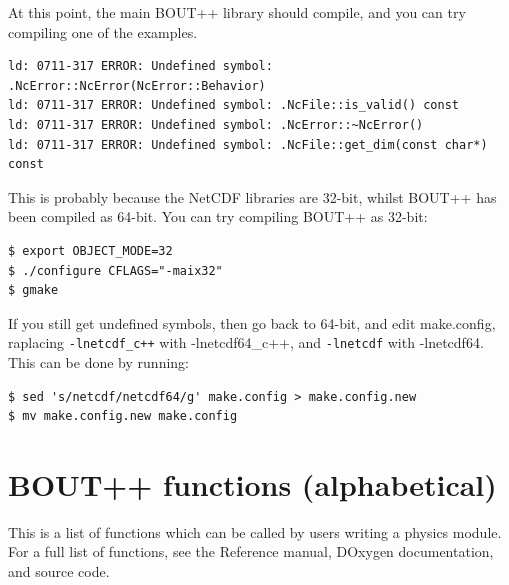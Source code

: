 \documentclass[12pt]{article}
\newcommand{\code}[1]{\texttt{#1}}
\begin{document}
At this point, the main BOUT++ library should compile, and you can try
compiling one of the examples. 

\begin{verbatim}
ld: 0711-317 ERROR: Undefined symbol: .NcError::NcError(NcError::Behavior)
ld: 0711-317 ERROR: Undefined symbol: .NcFile::is_valid() const
ld: 0711-317 ERROR: Undefined symbol: .NcError::~NcError()
ld: 0711-317 ERROR: Undefined symbol: .NcFile::get_dim(const char*) const
\end{verbatim}

This is probably because the NetCDF libraries are 32-bit, whilst BOUT++ has been compiled as 64-bit. 
You can try compiling BOUT++ as 32-bit:
\begin{verbatim}
$ export OBJECT_MODE=32
$ ./configure CFLAGS="-maix32"
$ gmake
\end{verbatim}
If you still get undefined symbols, then go back to 64-bit, and edit make.config, raplacing
\code{-lnetcdf\_c++} with {-lnetcdf64\_c++}, and \code{-lnetcdf} with {-lnetcdf64}. This 
can be done by running:
\begin{verbatim}
$ sed 's/netcdf/netcdf64/g' make.config > make.config.new
$ mv make.config.new make.config
\end{verbatim}

\section{BOUT++ functions (alphabetical)}

This is a list of functions which can be called by users writing
a physics module. For a full list of functions, see the Reference manual,
DOxygen documentation, and source code.
\end{document}

